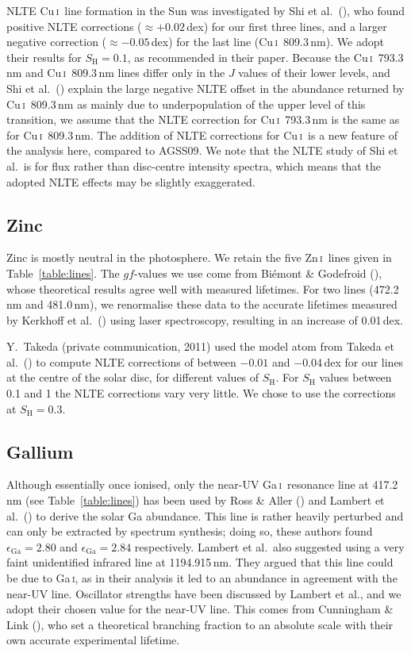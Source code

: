 \documentclass[traditabstract]{aa}
\newcommand{\altcui}{Cu\,\textsc{i}}
\newcommand{\altzni}{Zn\,\textsc{i}}
\newcommand{\altgai}{Ga\,\textsc{i}}
\newcommand{\cui}{\altcui\ }
\newcommand{\zni}{\altzni\ }
\newcommand{\gai}{\altgai\ }
\begin{document}
NLTE \cui line formation in the Sun was investigated by Shi et al.\ (\cite{Shi14}), who found positive NLTE corrections (\mbox{$\approx +0.02$}\,dex) for our first three lines, and a larger negative correction (\mbox{$\approx -0.05$}\,dex)  for the last line (\cui  809.3\,nm).  We adopt their results for $S_\mathrm{H}=0.1$, as recommended in their paper.  Because the \cui 793.3\,nm and \cui 809.3\,nm lines differ only in the $J$ values of their lower levels, and Shi et al.\ (\cite{Shi14}) explain the large negative NLTE offset in the abundance returned by \cui 809.3\,nm as mainly due to underpopulation of the upper level of this transition, we assume that the NLTE correction for \cui 793.3\,nm is the same as for \cui 809.3\,nm.  The addition of NLTE corrections for \cui is a new feature of the analysis here, compared to AGSS09. We note that the NLTE study of Shi et al.\ is for flux rather than disc-centre intensity spectra, which means that the adopted NLTE effects may be slightly exaggerated. 

\subsection{Zinc}
Zinc is mostly neutral in the photosphere. We retain the five \zni lines given in Table~\ref{table:lines}. The $gf$-values we use come from Bi\'{e}mont \& Godefroid (\cite{biem8}), whose theoretical results agree well with measured lifetimes. For two lines (472.2\,nm and 481.0\,nm), we renormalise these data to the accurate lifetimes measured by Kerkhoff et al.\ (\cite{Kerkhoff80}) using laser spectroscopy, resulting in an increase of 0.01\,dex.

Y.~Takeda (private communication, 2011) used the model atom from Takeda et al.\ (\cite{take}) to compute NLTE corrections of between $-0.01$ and $-0.04$\,dex for our lines at the centre
of the solar disc, for different values of $S_\mathrm{H}$. For $S_\mathrm{H}$ values between 0.1 and 1 the NLTE corrections vary very little.  We chose to use the corrections at $S_\mathrm{H}=0.3$.

\subsection{Gallium}
Although essentially once ionised, only the near-UV \gai resonance line at 417.2\,nm (see Table~\ref{table:lines}) has been used by Ross \& Aller (\cite{ross}) and Lambert et al.\ (\cite{lamb}) to derive the solar Ga abundance.  This line is rather heavily perturbed and can only be extracted by spectrum synthesis; doing so, these authors found $\epsilon_{\mathrm{Ga}}= 2.80$ and $\epsilon_{\mathrm{Ga}}= 2.84$ respectively. Lambert et al.\ also suggested using a very faint unidentified infrared line at 1194.915\,nm.  They argued that this line could be due to \altgai, as in their analysis it led to an abundance in agreement with the near-UV line.  Oscillator strengths have been discussed by Lambert et al., and we adopt their chosen value for the near-UV line.  This comes from Cunningham \& Link (\cite{Cunningham67}), who set a theoretical branching fraction to an absolute scale with their own accurate experimental lifetime.
\end{document}
